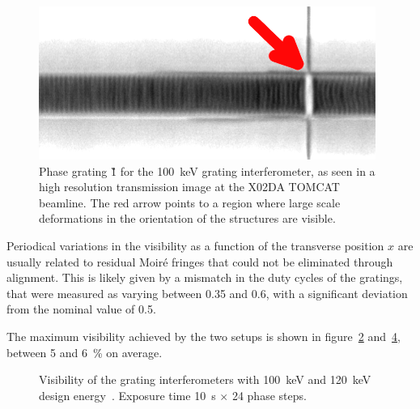 \begin{figure}[htb]
    \centering
    \includegraphics[width=\textwidth]{gfx/mythen-edge-on/tomcat-grating.png}
    \caption[Beamline radiography of a phase grating.]{Phase grating \G1 for the \SI{100}{\kilo\eV} grating
interferometer, as seen in a high resolution transmission image at the X02DA
TOMCAT beamline. The red arrow points to a region where large scale
deformations in the orientation of the structures are visible.}
    \label{fig:defects-tomcat}
\end{figure}

Periodical variations in the visibility as a function of the transverse
position $x$ are usually related to residual Moir\'e fringes that could not
be eliminated through alignment. This is likely given by a mismatch in the
duty cycles of the gratings, that were measured as varying between 
\num{0.35} and \num{0.6}, with a significant deviation from the nominal value
of \num{0.5}.

The maximum visibility achieved by the two setups is shown in 
figure~\ref{fig:visibility100} and~\ref{fig:visibility120}, between \num{5} and
\SI{6}{\percent} on average.

\begin{figure}[h!]
    \centering
    \begin{subfigure}[b]{.75\textwidth}
        \resizebox{\textwidth}{!}{}
        \caption{}
        \label{fig:visibility100}
    \end{subfigure}
    \begin{subfigure}[b]{.75\textwidth}
        \resizebox{\textwidth}{!}{}
        \caption{}
        \label{fig:visibility120}
    \end{subfigure}
    \caption{Visibility of the grating
        interferometers with
        \SI{100}{\kilo\eV} and \SI{120}{\kilo\eV} design
        energy~\parencite{galitesina}. Exposure time \SI{10}{\second}
        $\times$ \num{24} phase steps.}
\end{figure}

